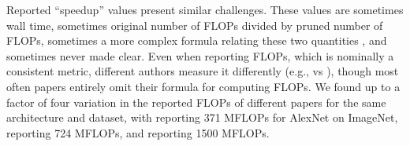 Reported ``speedup'' values present similar challenges. These values are sometimes wall time, sometimes original number of FLOPs divided by pruned number of FLOPs, sometimes a more complex formula relating these two quantities \cite{more-is-less, soft-filter-pruning}, and sometimes never made clear. Even when reporting FLOPs, which is nominally a consistent metric, different authors measure it differently (e.g., \cite{nvidia-taylor-pruning} vs \cite{convnet-tensor-decomp}), though most often papers entirely omit their formula for computing FLOPs. We found up to a factor of four variation in the reported FLOPs of different papers for the same architecture and dataset, with \cite{sze-energy-aware} reporting 371 MFLOPs for AlexNet on ImageNet, \cite{samsung-winograd-sparse} reporting 724 MFLOPs, and \cite{learning-both} reporting 1500 MFLOPs.
